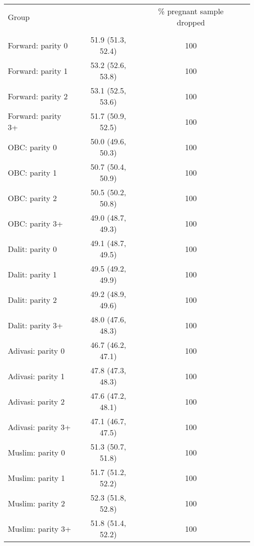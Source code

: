 \begin{tabular}{lccc}
\toprule
Group &  & \% pregnant sample dropped \\\\
\midrule
Forward: parity 0&51.9 (51.3, 52.4)&100\\
Forward: parity 1&53.2 (52.6, 53.8)&100\\
Forward: parity 2&53.1 (52.5, 53.6)&100\\
Forward: parity 3+&51.7 (50.9, 52.5)&100\\
OBC: parity 0&50.0 (49.6, 50.3)&100\\
OBC: parity 1&50.7 (50.4, 50.9)&100\\
OBC: parity 2&50.5 (50.2, 50.8)&100\\
OBC: parity 3+&49.0 (48.7, 49.3)&100\\
Dalit: parity 0&49.1 (48.7, 49.5)&100\\
Dalit: parity 1&49.5 (49.2, 49.9)&100\\
Dalit: parity 2&49.2 (48.9, 49.6)&100\\
Dalit: parity 3+&48.0 (47.6, 48.3)&100\\
Adivasi: parity 0&46.7 (46.2, 47.1)&100\\
Adivasi: parity 1&47.8 (47.3, 48.3)&100\\
Adivasi: parity 2&47.6 (47.2, 48.1)&100\\
Adivasi: parity 3+&47.1 (46.7, 47.5)&100\\
Muslim: parity 0&51.3 (50.7, 51.8)&100\\
Muslim: parity 1&51.7 (51.2, 52.2)&100\\
Muslim: parity 2&52.3 (51.8, 52.8)&100\\
Muslim: parity 3+&51.8 (51.4, 52.2)&100\\
\bottomrule
\end{tabular}
